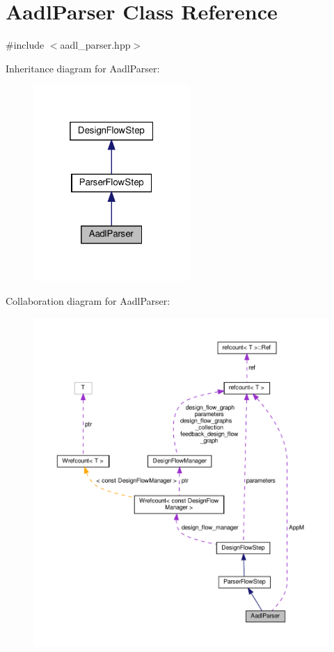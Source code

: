 \hypertarget{classAadlParser}{}\section{Aadl\+Parser Class Reference}
\label{classAadlParser}


{\ttfamily \#include $<$aadl\+\_\+parser.\+hpp$>$}



Inheritance diagram for Aadl\+Parser\+:
\nopagebreak
\begin{figure}[H]
\begin{center}
\leavevmode
\includegraphics[width=169pt]{d6/d93/classAadlParser__inherit__graph}
\end{center}
\end{figure}


Collaboration diagram for Aadl\+Parser\+:
\nopagebreak
\begin{figure}[H]
\begin{center}
\leavevmode
\includegraphics[width=350pt]{de/d20/classAadlParser__coll__graph}
\end{center}
\end{figure}
